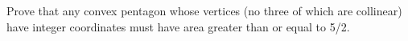 Prove that any convex pentagon whose vertices (no three of
which are collinear) have integer coordinates must have area greater than
or equal to 5/2.
